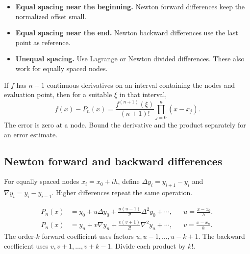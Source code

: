 \documentclass[12pt,a4paper]{article}
\begin{document}
\begin{itemize}[leftmargin=*, itemsep=3pt, topsep=4pt]
  \item \textbf{Equal spacing near the beginning.} Newton forward differences keep the normalized offset small.
  \item \textbf{Equal spacing near the end.} Newton backward differences use the last point as reference.
  \item \textbf{Unequal spacing.} Use Lagrange or Newton divided differences. These also work for equally spaced nodes.
\end{itemize}
\begin{tcolorbox}[formulabox, title={Interpolation remainder}]
If $f$ has $n+1$ continuous derivatives on an interval containing the nodes and evaluation point, then for a suitable $\xi$ in that interval,
\[
f(x)-P_n(x)=
 \frac{f^{(n+1)}(\xi)}{(n+1)!}
 \prod_{j=0}^{n}(x-x_j).
\]
The error is zero at a node. Bound the derivative and the product separately for an error estimate.
\end{tcolorbox}

\subsection{Newton forward and backward differences}
For equally spaced nodes $x_i=x_0+ih$, define $\Delta y_i=y_{i+1}-y_i$ and $\nabla y_i=y_i-y_{i-1}$. Higher differences repeat the same operation.
\begin{tcolorbox}[formulabox, title={Forward and backward formulas}]
\[
\begin{aligned}
P_n(x)&=y_0+u\Delta y_0
       +\frac{u(u-1)}{2!}\Delta^2y_0+\cdots,
       &&u=\frac{x-x_0}{h},\\
P_n(x)&=y_n+v\nabla y_n
       +\frac{v(v+1)}{2!}\nabla^2y_n+\cdots,
       &&v=\frac{x-x_n}{h}.
\end{aligned}
\]
The order-$k$ forward coefficient uses factors $u,u-1,\ldots,u-k+1$. The backward coefficient uses $v,v+1,\ldots,v+k-1$. Divide each product by $k!$.
\end{tcolorbox}
\end{document}
